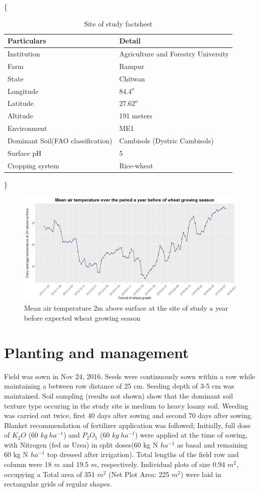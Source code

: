 \documentclass[12pt,oneside]{dukestatscithesis} %
\begin{document}
\small\{
\begin{longtable}[]{@{}ll@{}}
\caption{\label{tab:site-fact-tab}Site of study factsheet}\\
\toprule
\textbf{Particulars} & \textbf{Detail}\tabularnewline
\midrule
\endhead
Institution & Agriculture and Forestry University\tabularnewline
Farm & Rampur\tabularnewline
State & Chitwan\tabularnewline
Longitude & \(84.4^o\)\tabularnewline
Latitude & \(27.62^o\)\tabularnewline
Altitude & 191 meters\tabularnewline
Environment & ME1\tabularnewline
Dominant Soil(FAO classification) & Cambisols (Dystric
Cambisols)\tabularnewline
Surface pH & 5\tabularnewline
Cropping system & Rice-wheat\tabularnewline
\bottomrule
\end{longtable}
\}
\begin{figure}

{\centering \includegraphics[width=0.9\linewidth]{../images/mean_air_temp_a_year_before} 

}

\caption{Mean air temperature 2m above surface at the site of study a year before expected wheat growing season}\label{fig:weather-previous}
\end{figure}
\setlength{\baselineskip}{1.5\baselineskip}

\hypertarget{planting-and-management}{%
\section{Planting and management}\label{planting-and-management}}

Field was sown in Nov 24, 2016. Seeds were continuously sown within a row while maintaining a between row distance of 25 cm. Seeding depth of 3-5 cm was maintained. Soil sampling (results not shown) show that the dominant soil texture type occuring in the study site is medium to heavy loamy soil. Weeding was carried out twice, first 40 days after sowing and second 70 days after sowing. Blanket recommendation of fertilizer application was followed; Initially, full dose of \(K_2O\) (60 \(kg\ ha^{-1}\)) and \(P_2O_5\) (60 \(kg\ ha^{-1}\)) were applied at the time of sowing, with Nitrogen (fed as Urea) in split doses(60 kg N \(ha^{-1}\) as basal and remaining 60 kg N \(ha^{-1}\) top dressed after irrigation). Total lengths of the field row and column were 18 \(m\) and 19.5 \(m\), respectively. Individual plots of size 0.94 \(m^2\), occupying a Total area of 351 \(m^2\) (Net Plot Area: 225 \(m^2\)) were laid in rectangular grids of regular shapes.
\end{document}
